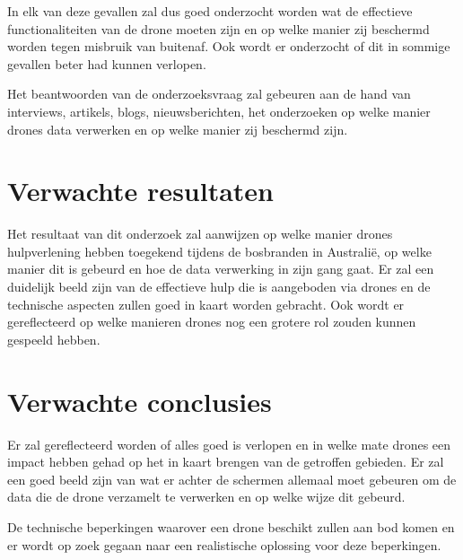 In elk van deze gevallen zal dus goed onderzocht worden wat de effectieve functionaliteiten van de drone moeten zijn en op welke manier zij beschermd worden tegen misbruik van buitenaf. Ook wordt er onderzocht of dit in sommige gevallen beter had kunnen verlopen.

Het beantwoorden van de onderzoeksvraag zal gebeuren aan de hand van interviews, artikels, blogs, nieuwsberichten, het onderzoeken op welke manier drones data verwerken en op welke manier zij beschermd zijn.

\section{Verwachte resultaten}
\label{sec:verwachte_resultaten}

Het resultaat van dit onderzoek zal aanwijzen op welke manier drones hulpverlening hebben toegekend tijdens de bosbranden in Australië, op welke manier dit is gebeurd en hoe de data verwerking in zijn gang gaat. Er zal een duidelijk beeld zijn van de effectieve hulp die is aangeboden via drones en de technische aspecten zullen goed in kaart worden gebracht. Ook wordt er gereflecteerd op welke manieren drones nog een grotere rol zouden kunnen gespeeld hebben.


\section{Verwachte conclusies}
\label{sec:verwachte_conclusies}

Er zal gereflecteerd worden of alles goed is verlopen en in welke mate drones een impact hebben gehad op het in kaart brengen van de getroffen gebieden. Er zal een goed beeld zijn van wat er achter de schermen allemaal moet gebeuren om de data die de drone verzamelt te verwerken en op welke wijze dit gebeurd.

De technische beperkingen waarover een drone beschikt zullen aan bod komen en er wordt op zoek gegaan naar een realistische oplossing voor deze beperkingen.

